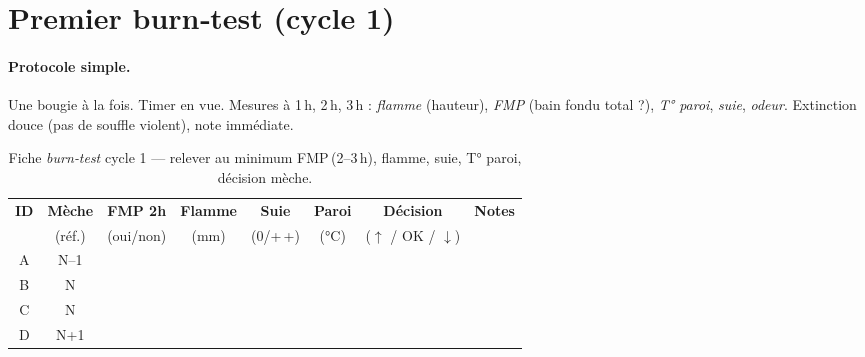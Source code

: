 \documentclass[../../main.tex]{subfiles}
\begin{document}
\section{Premier burn‑test (cycle 1)}

\paragraph{Protocole simple.}
Une bougie à la fois. Timer en vue. Mesures à 1\,h, 2\,h, 3\,h : \textit{flamme} (hauteur), \textit{FMP} (bain fondu total ?), \textit{T° paroi}, \textit{suie}, \textit{odeur}. Extinction douce (pas de souffle violent), note immédiate.

\begin{table}[!h]
  \centering
  \small
  \setlength{\tabcolsep}{4.5pt}
  \renewcommand{\arraystretch}{1.22}
  \begin{tabularx}{\textwidth}{c c c c c c c X}
    \toprule
    \rowcolor{lightgray!35}
    \textbf{ID} & \textbf{Mèche} & \textbf{FMP 2h} & \textbf{Flamme} & \textbf{Suie} & \textbf{Paroi} & \textbf{Décision} & \textbf{Notes} \\
    & (réf.) & (oui/non) & (mm) & (0/+\,+) & (\si{\celsius}) & (\(\uparrow\) / OK / \(\downarrow\)) & \\
    \midrule
    A & N--1 &  &  &  &  &  &  \\
    B & N    &  &  &  &  &  &  \\
    C & N    &  &  &  &  &  &  \\
    D & N+1  &  &  &  &  &  &  \\
    \bottomrule
  \end{tabularx}
  \caption{Fiche \textit{burn‑test} cycle 1 — relever au minimum FMP\,(2--3\,h), flamme, suie, T° paroi, décision mèche.}
\end{table}
\end{document}
